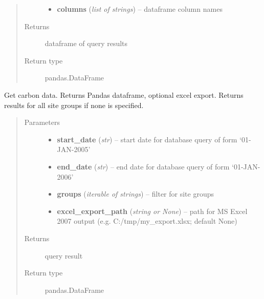 \documentclass[letterpaper,10pt,english]{sphinxmanual}
\begin{document}
\begin{fulllineitems}
\begin{fulllineitems}
\begin{quote}
\begin{description}
\begin{itemize}
\item {} 
\textbf{columns} (\emph{list of strings}) -- dataframe column names

\end{itemize}

\item[{Returns}] \leavevmode
dataframe of query results

\item[{Return type}] \leavevmode
pandas.DataFrame

\end{description}\end{quote}

\end{fulllineitems}


\begin{fulllineitems}
\label{modules:webb_utils.retrieve_data.RetrieveData.get_carbon_data}
Get carbon data. Returns Pandas dataframe, optional excel export.
Returns results for all site groups if none is specified.
\begin{quote}\begin{description}
\item[{Parameters}] \leavevmode\begin{itemize}
\item {} 
\textbf{start\_date} (\emph{str}) -- start date for database query of form `01-JAN-2005'

\item {} 
\textbf{end\_date} (\emph{str}) -- end date for database query of form `01-JAN-2006'

\item {} 
\textbf{groups} (\emph{iterable of strings}) -- filter for site groups

\item {} 
\textbf{excel\_export\_path} (\emph{string or None}) -- path for MS Excel 2007 output (e.g. C:/tmp/my\_export.xlsx; default None)

\end{itemize}

\item[{Returns}] \leavevmode
query result

\item[{Return type}] \leavevmode
pandas.DataFrame


\end{description}
\end{quote}
\end{fulllineitems}
\end{fulllineitems}
\end{document}
